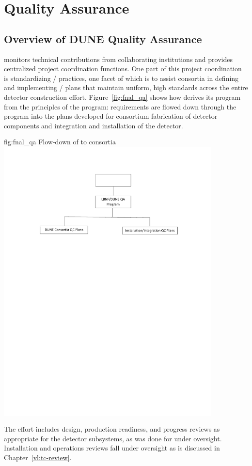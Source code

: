 \chapter{Quality Assurance}
\label{vl:tc-QA}

\section{Overview of DUNE Quality Assurance}

  monitors technical contributions from
collaborating institutions and provides centralized project
coordination functions. One part of this project coordination is
standardizing / practices, one facet
of which is to assist consortia in defining and implementing
/ plans that maintain uniform, high
standards across the entire detector construction
effort. Figure~\ref{fig:fnal_qa} shows how  
derives its  program from the principles of the \fnal {} program:
requirements are flowed down through the 
 program into the  plans developed for consortium fabrication of
detector components and integration and installation of the detector.
\begin{dunefigure}[\fnal QA]{fig:fnal_qa}
  {Flow-down of \fnal {} to consortia}
  \includegraphics[width=0.85\textwidth]{graphics/fnal_qa.pdf}
\end{dunefigure}
The  effort includes design, production readiness, and
progress reviews as appropriate for the  detector
subsystems, as was done for  under 
oversight. Installation and operations reviews fall under 
oversight as is discussed in Chapter~\ref{vl:tc-review}.

